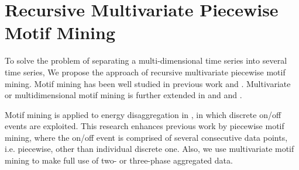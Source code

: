 \section{Recursive Multivariate Piecewise Motif Mining}
To solve the problem of separating a multi-dimensional time series into several time series, 
We propose the approach of recursive multivariate piecewise motif mining. 
Motif mining has been well studied in previous work \cite{motif1} and \cite{motif2}. 
Multivariate or multidimensional motif mining is further extended in \cite{minnen2007improving} and \cite{tanaka2005discovery} and \cite{motifgoal}. 

Motif mining is applied to energy disaggregation in \cite{shao2013temporal}, 
in which discrete on/off events are exploited. 
This research enhances previous work by piecewise motif mining, 
where the on/off event is comprised of several consecutive data points, 
i.e. piecewise, other than individual discrete one.
Also, we use multivariate motif mining to make full use of two- or three-phase aggregated data. 

